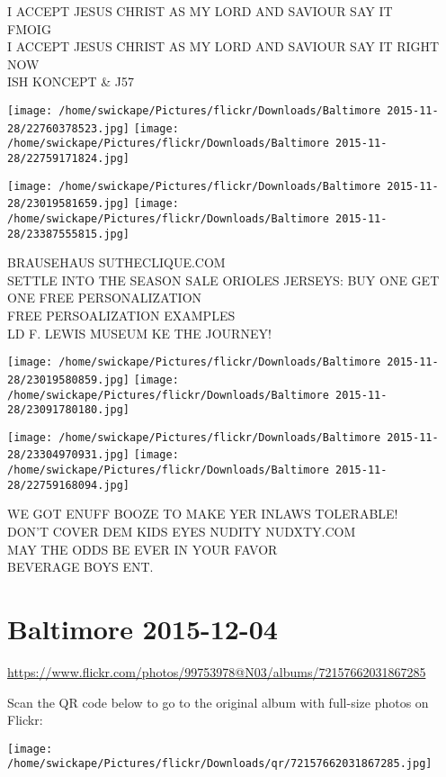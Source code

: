 \documentclass[10pt,letterpaper]{article}
\begin{document}
I ACCEPT JESUS CHRIST AS MY LORD AND SAVIOUR SAY IT\\
FMOIG\\
I ACCEPT JESUS CHRIST AS MY LORD AND SAVIOUR SAY IT RIGHT NOW\\
ISH KONCEPT \& J57
\pagebreak

\texttt{[image: /home/swickape/Pictures/flickr/Downloads/Baltimore 2015-11-28/22760378523.jpg]}
\texttt{[image: /home/swickape/Pictures/flickr/Downloads/Baltimore 2015-11-28/22759171824.jpg]}

\texttt{[image: /home/swickape/Pictures/flickr/Downloads/Baltimore 2015-11-28/23019581659.jpg]}
\texttt{[image: /home/swickape/Pictures/flickr/Downloads/Baltimore 2015-11-28/23387555815.jpg]}

BRAUSEHAUS SUTHECLIQUE.COM\\
SETTLE INTO THE SEASON SALE ORIOLES JERSEYS: BUY ONE GET ONE FREE PERSONALIZATION\\
FREE PERSOALIZATION EXAMPLES\\
LD F. LEWIS MUSEUM KE THE JOURNEY!
\pagebreak

\texttt{[image: /home/swickape/Pictures/flickr/Downloads/Baltimore 2015-11-28/23019580859.jpg]}
\texttt{[image: /home/swickape/Pictures/flickr/Downloads/Baltimore 2015-11-28/23091780180.jpg]}

\texttt{[image: /home/swickape/Pictures/flickr/Downloads/Baltimore 2015-11-28/23304970931.jpg]}
\texttt{[image: /home/swickape/Pictures/flickr/Downloads/Baltimore 2015-11-28/22759168094.jpg]}

WE GOT ENUFF BOOZE TO MAKE YER INLAWS TOLERABLE!\\
DON'T COVER DEM KIDS EYES NUDITY NUDXTY.COM\\
MAY THE ODDS BE EVER IN YOUR FAVOR\\
BEVERAGE BOYS ENT.
\pagebreak

\section*{Baltimore 2015-12-04}

\url{https://www.flickr.com/photos/99753978@N03/albums/72157662031867285}

Scan the QR code below to go to the original album with full-size photos on Flickr:

\texttt{[image: /home/swickape/Pictures/flickr/Downloads/qr/72157662031867285.jpg]}
\pagebreak
\end{document}
